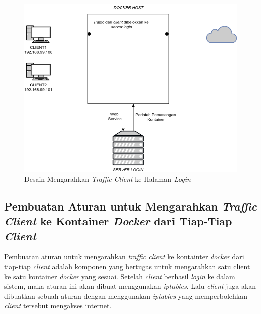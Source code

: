 	\begin{figure}[H]
		\centering
		\includegraphics[width=\linewidth]{images/bab3/DIAGRAM2}
		\caption{Desain Mengarahkan \textit{Traffic Client} ke Halaman \textit{Login}}
		\label{dessainmengarahkankehalamanlogin}
	\end{figure}

   	\subsection{Pembuatan Aturan untuk Mengarahkan \textit{Traffic Client} ke Kontainer \textit{Docker} dari Tiap-Tiap \textit{Client}}
   	Pembuatan aturan untuk mengarahkan \textit{traffic client} ke kontainter \textit{docker} dari tiap-tiap \textit{client} adalah komponen yang bertugas untuk mengarahkan satu client ke satu kontainer \textit{docker} yang sesuai. Setelah \textit{client} berhasil \textit{login} ke dalam sistem, maka aturan ini akan dibuat menggunakan \textit{iptables}. Lalu \textit{client} juga akan dibuatkan sebuah aturan dengan menggunakan \textit{iptables} yang memperbolehkan \textit{client} tersebut mengakses internet.